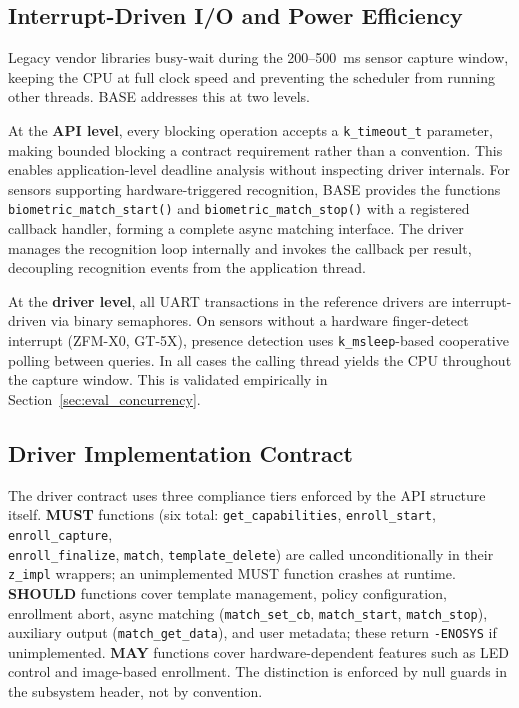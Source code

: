 \subsection{Interrupt-Driven I/O and Power Efficiency}
\label{sec:interrupt_io}

Legacy vendor libraries busy-wait during the \num{200}--\SI{500}{\milli\second} sensor capture window, keeping the CPU at full clock speed and preventing the scheduler from running other threads. BASE addresses this at two levels.

At the \textbf{API level}, every blocking operation accepts a \texttt{k\_timeout\_t} parameter, making bounded blocking a contract requirement rather than a convention. This enables application-level deadline analysis without inspecting driver internals. For sensors supporting hardware-triggered recognition, BASE provides the functions \texttt{biometric\_match\_start()} and \texttt{biometric\_match\_stop()} with a registered callback handler, forming a complete async matching interface. The driver manages the recognition loop internally and invokes the callback per result, decoupling recognition events from the application thread.

At the \textbf{driver level}, all UART transactions in the reference drivers are interrupt-driven via binary semaphores. On sensors without a hardware finger-detect interrupt (ZFM-X0, GT-5X), presence detection uses \texttt{k\_msleep}-based cooperative polling between queries. In all cases the calling thread yields the CPU throughout the capture window. This is validated empirically in Section~\ref{sec:eval_concurrency}.

\subsection{Driver Implementation Contract}

The driver contract uses three compliance tiers enforced by the API structure itself. \textbf{MUST} functions (six total: \texttt{get\_capabilities}, \texttt{enroll\_start}, \texttt{enroll\_capture}, \\ \texttt{enroll\_finalize}, \texttt{match}, \texttt{template\_delete}) are called unconditionally in their \texttt{z\_impl} wrappers; an unimplemented MUST function crashes at runtime. \textbf{SHOULD} functions cover template management, policy configuration, enrollment abort, async matching (\texttt{match\_set\_cb}, \texttt{match\_start}, \texttt{match\_stop}), auxiliary output (\texttt{match\_get\_data}), and user metadata; these return \texttt{-ENOSYS} if unimplemented. \textbf{MAY} functions cover hardware-dependent features such as LED control and image-based enrollment. The distinction is enforced by null guards in the subsystem header, not by convention.

